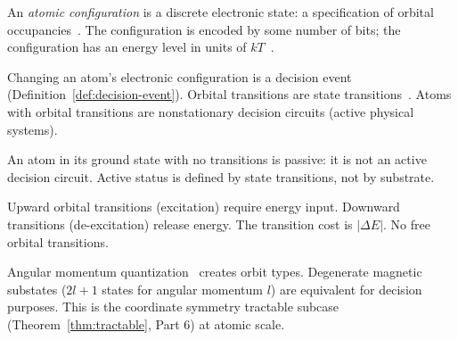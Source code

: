 \begin{definition}\label{def:atomic-config}
An \emph{atomic configuration} is a discrete electronic state: a specification of orbital occupancies~\cite{sakurai2017modern}. The configuration is encoded by some number of bits; the configuration has an energy level in units of $kT$~\cite{kittel1980thermal}.
\end{definition}

\begin{theorem}\label{thm:orbital-transition}
Changing an atom's electronic configuration is a decision event (Definition~\ref{def:decision-event}). Orbital transitions are state transitions~\cite{sakurai2017modern}. Atoms with orbital transitions are nonstationary decision circuits (active physical systems).
\end{theorem}

\begin{corollary}\label{cor:ground-state-passive}
An atom in its ground state with no transitions is passive: it is not an active decision circuit. Active status is defined by state transitions, not by substrate.
\end{corollary}

\begin{theorem}\label{thm:orbital-cost}
Upward orbital transitions (excitation) require energy input. Downward transitions (de-excitation) release energy. The transition cost is $|\Delta E|$. No free orbital transitions.
\end{theorem}

\begin{proposition}\label{prop:orbital-symmetry}
Angular momentum quantization~\cite{sakurai2017modern} creates orbit types. Degenerate magnetic substates ($2l+1$ states for angular momentum $l$) are equivalent for decision purposes. This is the coordinate symmetry tractable subcase (Theorem~\ref{thm:tractable}, Part 6) at atomic scale.
\end{proposition}

